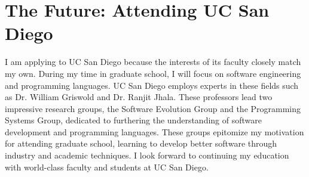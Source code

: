 \section*{The Future: Attending UC San Diego}
I am applying to UC San Diego because the interests of its faculty closely match my own. During my time in graduate school, I will focus on software engineering and programming languages. UC San Diego employs experts in these fields such as Dr. William Griswold and Dr. Ranjit Jhala. These professors lead two impressive research groups, the Software Evolution Group and the Programming Systems Group, dedicated to furthering the understanding of software development and programming languages. These groups epitomize my motivation for attending graduate school, learning to develop better software through industry and academic techniques. I look forward to continuing my education with world-class faculty and students at UC San Diego.